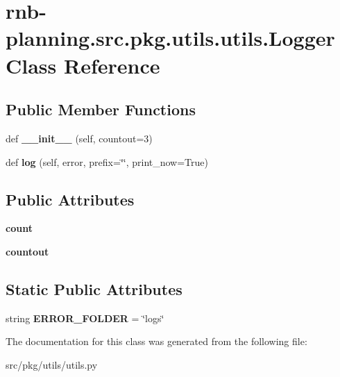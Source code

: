 \hypertarget{classrnb-planning_1_1src_1_1pkg_1_1utils_1_1utils_1_1_logger}{}\section{rnb-\/planning.src.\+pkg.\+utils.\+utils.\+Logger Class Reference}
\label{classrnb-planning_1_1src_1_1pkg_1_1utils_1_1utils_1_1_logger}
\subsection*{Public Member Functions}
\begin{DoxyCompactItemize}
\item 
\mbox{\label{classrnb-planning_1_1src_1_1pkg_1_1utils_1_1utils_1_1_logger_a65aa419fad34d053711d5181fd2af94a}} 
def {\bfseries \+\_\+\+\_\+init\+\_\+\+\_\+} (self, countout=3)
\item 
\mbox{\label{classrnb-planning_1_1src_1_1pkg_1_1utils_1_1utils_1_1_logger_a3eb5dee40e604cea9eef9169071bbe22}} 
def {\bfseries log} (self, error, prefix=\char`\"{}\char`\"{}, print\+\_\+now=True)
\end{DoxyCompactItemize}
\subsection*{Public Attributes}
\begin{DoxyCompactItemize}
\item 
\mbox{\label{classrnb-planning_1_1src_1_1pkg_1_1utils_1_1utils_1_1_logger_a1ef922dafa3fe5a185ba1d914acd8c7c}} 
{\bfseries count}
\item 
\mbox{\label{classrnb-planning_1_1src_1_1pkg_1_1utils_1_1utils_1_1_logger_a5f004a7c6bb57a22b2f72f9b99f2cc87}} 
{\bfseries countout}
\end{DoxyCompactItemize}
\subsection*{Static Public Attributes}
\begin{DoxyCompactItemize}
\item 
\mbox{\label{classrnb-planning_1_1src_1_1pkg_1_1utils_1_1utils_1_1_logger_aecefd922624623f7e6f196569ea0012b}} 
string {\bfseries E\+R\+R\+O\+R\+\_\+\+F\+O\+L\+D\+ER} = \char`\"{}logs\char`\"{}
\end{DoxyCompactItemize}


The documentation for this class was generated from the following file\+:\begin{DoxyCompactItemize}
\item 
src/pkg/utils/utils.\+py\end{DoxyCompactItemize}
